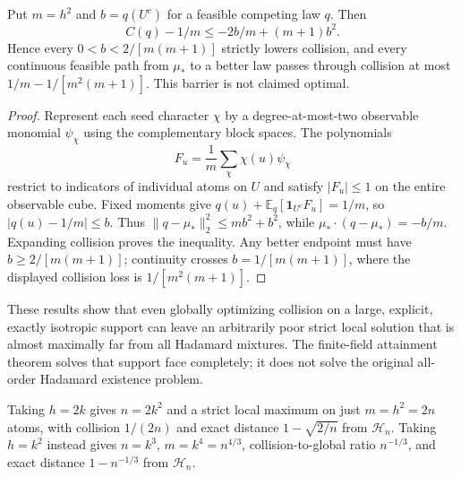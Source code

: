 \begin{proposition}
\label{prop:design-concentrated-barrier}
Put $m=h^2$ and $b=q(U^c)$ for a feasible competing law $q$. Then
\[
 C(q)-1/m\le-2b/m+(m+1)b^2.
\]
Hence every $0<b<2/[m(m+1)]$ strictly lowers collision, and every
continuous feasible path from $\mu_*$ to a better law passes through
collision at most $1/m-1/[m^2(m+1)]$. This barrier is not claimed optimal.
\end{proposition}
\begin{proof}
Represent each seed character $\chi$ by a degree-at-most-two observable
monomial $\psi_\chi$ using the complementary block spaces. The polynomials
\[
 F_u=\frac1m\sum_\chi\chi(u)\psi_\chi
\]
restrict to indicators of individual atoms on $U$ and satisfy
$|F_u|\le1$ on the entire observable cube. Fixed moments give
$q(u)+\mathbb E_q[\mathbf1_{U^c}F_u]=1/m$, so
$|q(u)-1/m|\le b$. Thus
$\|q-\mu_*\|_2^2\le mb^2+b^2$, while
$\mu_*\cdot(q-\mu_*)=-b/m$. Expanding collision proves the inequality.
Any better endpoint must have $b\ge2/[m(m+1)]$; continuity crosses
$b=1/[m(m+1)]$, where the displayed collision loss is $1/[m^2(m+1)]$.
\end{proof}

These results show that even globally optimizing collision on a large,
explicit, exactly isotropic support can leave an arbitrarily poor strict
local solution that is almost maximally far from all Hadamard mixtures.
The finite-field attainment theorem solves that support face completely;
it does not solve the original all-order Hadamard existence problem.

\begin{corollary}
\label{cor:design-moderate-support}
Taking $h=2k$ gives $n=2k^2$ and a strict local maximum on just
$m=h^2=2n$ atoms, with collision $1/(2n)$ and exact distance
$1-\sqrt{2/n}$ from $\mathcal H_n$. Taking $h=k^2$ instead gives
$n=k^3$, $m=k^4=n^{4/3}$, collision-to-global ratio $n^{-1/3}$,
and exact distance $1-n^{-1/3}$ from $\mathcal H_n$.
\end{corollary}
